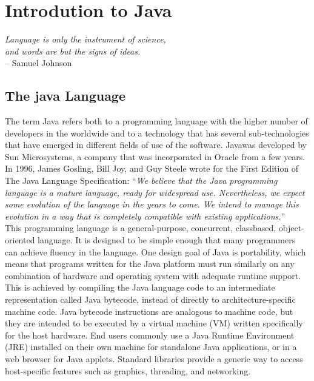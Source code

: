 \chapter{Introdution to Java}
\label{ch:java}


\begin{flushright}
	{\smaller
		\textit{Language is only the instrument of science, \\and words are but the signs of ideas.}\\
		-- Samuel Johnson}
\end{flushright}


\section{The java Language}
The term Java refers both to a programming language with the higher number of developers in the worldwide and to a technology that has several sub-technologies that have emerged in different fields of use of the software. Javawas developed by Sun Microsystems, a company that was incorporated in Oracle from a few years.
In 1996, James Gosling, Bill Joy, and Guy Steele wrote for the First Edition of The Java Language Specification:
``{\itshape We believe that the Java programming language is a mature language, ready for widespread use. Nevertheless, we expect some evolution of the language in the years to come. We intend to manage this evolution in a way that is completely compatible with existing applications.}''\\
This programming language is a general-purpose, concurrent, classbased, object-oriented language. It is designed to be simple enough that many programmers can achieve fluency in the language.\cite{javaoracle}
One design goal of Java is portability, which means that programs written for the Java platform must run similarly on any combination of hardware and operating system with adequate runtime support. This is achieved by compiling the Java language code to an intermediate representation called Java bytecode, instead of directly to architecture-specific machine code. Java bytecode instructions are analogous to machine code, but they are intended to be executed by a virtual machine (VM) written specifically for the host hardware. End users commonly use a Java Runtime Environment (JRE) installed on their own machine for standalone Java applications, or in a web browser for Java applets.\cite{wiki:java}
Standard libraries provide a generic way to access host-specific features such as graphics, threading, and networking.\\
